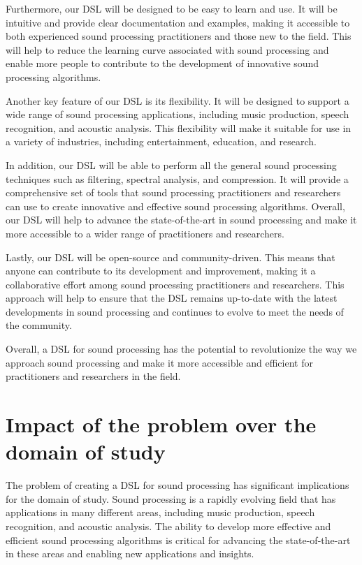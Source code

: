 Furthermore, our DSL will be designed to be easy to learn and use. It will be intuitive and provide clear documentation and examples, making it accessible to both experienced sound processing practitioners and those new to the field. This will help to reduce the learning curve associated with sound processing and enable more people to contribute to the development of innovative sound processing algorithms.

Another key feature of our DSL is its flexibility. It will be designed to support a wide range of sound processing applications, including music production, speech recognition, and acoustic analysis. This flexibility will make it suitable for use in a variety of industries, including entertainment, education, and research.

In addition, our DSL will be able to perform all the general sound processing techniques such as filtering, spectral analysis, and compression. It will provide a comprehensive set of tools that sound processing practitioners and researchers can use to create innovative and effective sound processing algorithms. Overall, our DSL will help to advance the state-of-the-art in sound processing and make it more accessible to a wider range of practitioners and researchers.

Lastly, our DSL will be open-source and community-driven. This means that anyone can contribute to its development and improvement, making it a collaborative effort among sound processing practitioners and researchers. This approach will help to ensure that the DSL remains up-to-date with the latest developments in sound processing and continues to evolve to meet the needs of the community.

Overall, a DSL for sound processing has the potential to revolutionize the way we approach sound processing and make it more accessible and efficient for practitioners and researchers in the field.
\section{Impact of the problem over the domain of study} 
The problem of creating a DSL for sound processing has significant implications for the domain of study. Sound processing is a rapidly evolving field that has applications in many different areas, including music production, speech recognition, and acoustic analysis. The ability to develop more effective and efficient sound processing algorithms is critical for advancing the state-of-the-art in these areas and enabling new applications and insights.

